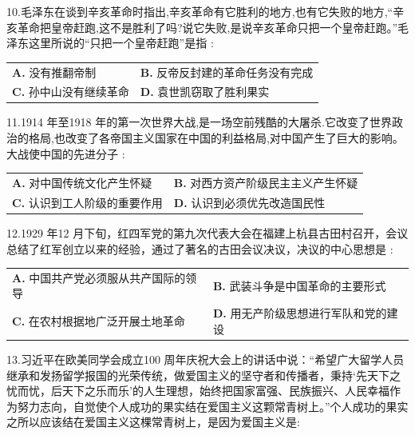 \documentclass[UTF8,11pt]{ctexart}
\begin{document}
10.毛泽东在谈到辛亥革命时指出,辛亥革命有它胜利的地方,也有它失败的地方,“辛亥革命把皇帝赶跑,这不是胜利了吗?说它失败,是说辛亥革命只把一个皇帝赶跑。”毛泽东这里所说的“只把一个皇帝赶跑”是指 :


\begin{center}\begin{tabular}{>{\raggedright\arraybackslash}p{\dimexpr(\linewidth-4\tabcolsep)/2\relax}>{\raggedright\arraybackslash}p{\dimexpr(\linewidth-4\tabcolsep)/2\relax}}
\textbf{A.} 没有推翻帝制 & \textbf{B.} 反帝反封建的革命任务没有完成\\[.35em]
\textbf{C.} 孙中山没有继续革命 & \textbf{D.} 袁世凯窃取了胜利果实\\[.35em]\end{tabular}\end{center}

11.1914 年至1918 年的第一次世界大战,是一场空前残酷的大屠杀.它改变了世界政治的格局,也改变了各帝国主义国家在中国的利益格局,对中国产生了巨大的影响。大战使中国的先进分子 :


\begin{center}\begin{tabular}{>{\raggedright\arraybackslash}p{\dimexpr(\linewidth-4\tabcolsep)/2\relax}>{\raggedright\arraybackslash}p{\dimexpr(\linewidth-4\tabcolsep)/2\relax}}
\textbf{A.} 对中国传统文化产生怀疑 & \textbf{B.} 对西方资产阶级民主主义产生怀疑\\[.35em]
\textbf{C.} 认识到工人阶级的重要作用 & \textbf{D.} 认识到必须优先改造国民性\\[.35em]\end{tabular}\end{center}

12.1929 年12 月下旬，红四军党的第九次代表大会在福建上杭县古田村召开，会议总结了红军创立以来的经验，通过了著名的古田会议决议，决议的中心思想是 :


\begin{center}\begin{tabular}{>{\raggedright\arraybackslash}p{\dimexpr(\linewidth-4\tabcolsep)/2\relax}>{\raggedright\arraybackslash}p{\dimexpr(\linewidth-4\tabcolsep)/2\relax}}
\textbf{A.} 中国共产党必须服从共产国际的领导 & \textbf{B.} 武装斗争是中国革命的主要形式\\[.35em]
\textbf{C.} 在农村根据地广泛开展土地革命 & \textbf{D.} 用无产阶级思想进行军队和党的建设\\[.35em]\end{tabular}\end{center}

13.习近平在欧美同学会成立100 周年庆祝大会上的讲话中说：“希望广大留学人员继承和发扬留学报国的光荣传统，做爱国主义的坚守者和传播者，秉持‘先天下之忧而忧，后天下之乐而乐’的人生理想，始终把国家富强、民族振兴、人民幸福作为努力志向，自觉使个人成功的果实结在爱国主义这颗常青树上。”个人成功的果实之所以应该结在爱国主义这棵常青树上，是因为爱国主义是:
\end{document}
